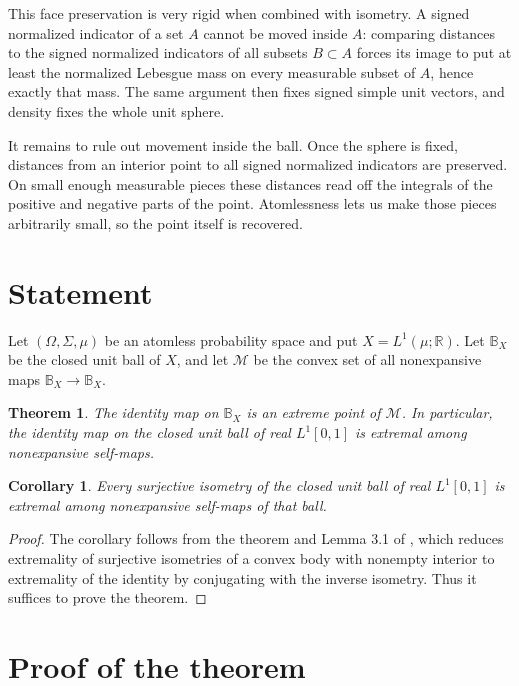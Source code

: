 \documentclass[11pt]{article}
\newtheorem{theorem}{Theorem}
\newtheorem{corollary}{Corollary}
\newcommand{\B}{\mathbb{B}}
\newcommand{\R}{\mathbb{R}}
\begin{document}
This face preservation is very rigid when combined with isometry. A signed
normalized indicator of a set \(A\) cannot be moved inside \(A\): comparing
distances to the signed normalized indicators of all subsets \(B\subset A\)
forces its image to put at least the normalized Lebesgue mass on every
measurable subset of \(A\), hence exactly that mass. The same argument then
fixes signed simple unit vectors, and density fixes the whole unit sphere.

It remains to rule out movement inside the ball. Once the sphere is fixed,
distances from an interior point to all signed normalized indicators are
preserved. On small enough measurable pieces these distances read off the
integrals of the positive and negative parts of the point. Atomlessness lets us
make those pieces arbitrarily small, so the point itself is recovered.

\section*{Statement}

Let \((\Omega,\Sigma,\mu)\) be an atomless probability space and put
\(X=L^1(\mu;\R)\). Let \(\B_X\) be the closed unit ball of \(X\), and let
\(\mathcal M\) be the convex set of all nonexpansive maps
\(\B_X\to\B_X\).

\begin{theorem}
The identity map on \(\B_X\) is an extreme point of \(\mathcal M\). In
particular, the identity map on the closed unit ball of real \(L^1[0,1]\) is
extremal among nonexpansive self-maps.
\end{theorem}

\begin{corollary}
Every surjective isometry of the closed unit ball of real \(L^1[0,1]\) is
extremal among nonexpansive self-maps of that ball.
\end{corollary}

\begin{proof}
The corollary follows from the theorem and Lemma 3.1 of \cite{BDP}, which
reduces extremality of surjective isometries of a convex body with nonempty
interior to extremality of the identity by conjugating with the inverse
isometry. Thus it suffices to prove the theorem.
\end{proof}

\section*{Proof of the theorem}
\end{document}
